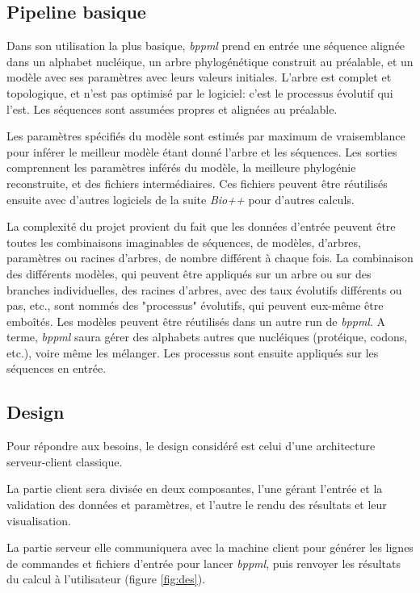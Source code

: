 \subsection{Pipeline basique}

Dans son utilisation la plus basique,
\textit{bppml} prend en entrée une séquence alignée dans un alphabet nucléique,
un arbre phylogénétique construit au préalable,
et un modèle avec ses paramètres
avec leurs valeurs initiales.
L'arbre est complet et topologique,
et n'est pas optimisé par le logiciel:
c'est le processus évolutif qui l'est.
Les séquences sont assumées propres et alignées au préalable.

Les paramètres spécifiés du modèle sont estimés par maximum de vraisemblance
pour inférer le meilleur modèle étant donné l'arbre et les séquences.
Les sorties comprennent les paramètres inférés du modèle,
la meilleure phylogénie reconstruite,
et des fichiers intermédiaires.
Ces fichiers peuvent être réutilisés ensuite
avec d'autres logiciels de la suite \textit{Bio++}
pour d'autres calculs.

La complexité du projet provient du fait que les données d'entrée
peuvent être toutes les combinaisons imaginables
de séquences, de modèles, d'arbres, paramètres ou racines d'arbres,
de nombre différent à chaque fois.
La combinaison des différents modèles,
qui peuvent être appliqués sur un arbre ou sur des branches individuelles,
des racines d'arbres,
avec des taux évolutifs différents ou pas, etc.,
sont nommés des "processus" évolutifs,
qui peuvent eux-même être emboîtés.
Les modèles peuvent être réutilisés
dans un autre run de \textit{bppml}.
A terme, \textit{bppml} saura gérer des alphabets autres que nucléiques
(protéique, codons, etc.),
voire même les mélanger.
Les processus sont ensuite appliqués sur les séquences en entrée.


\subsection{Design}

Pour répondre aux besoins,
le design considéré est celui d'une architecture serveur-client classique.

La partie client sera divisée en deux composantes,
l'une gérant l'entrée et la validation des données et paramètres,
et l'autre le rendu des résultats et leur visualisation.

La partie serveur elle communiquera avec la machine client
pour générer les lignes de commandes et fichiers d'entrée
pour lancer \textit{bppml},
puis renvoyer les résultats du calcul à l'utilisateur (figure \ref{fig:des}).

